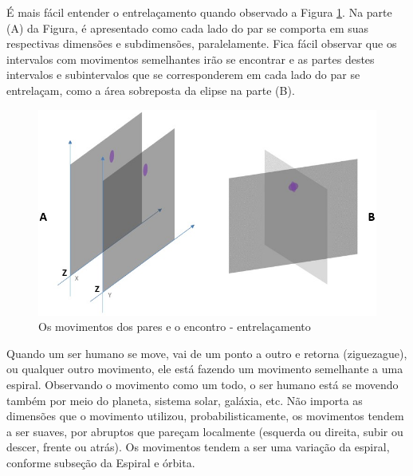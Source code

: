 É mais fácil entender o entrelaçamento quando observado a Figura \ref{fig:consciousness_space_dimensions}. Na parte (A) da Figura, é apresentado como cada lado do par se comporta em suas respectivas dimensões e subdimensões, paralelamente. Fica fácil observar que os intervalos com movimentos semelhantes irão se encontrar e as partes destes intervalos e subintervalos que se corresponderem em cada lado do par se entrelaçam, como a área sobreposta da elipse na parte (B).  
	\begin{figure}[H]
	\caption{Os movimentos dos pares e o encontro - entrelaçamento}
	\label{fig:consciousness_space_dimensions}
	\centering
	\includegraphics[scale=.7]{sections/images/consciousness_space_dimensions.jpg}
	\end{figure}

Quando um ser humano se move, vai de um ponto a outro e retorna (ziguezague), ou qualquer outro movimento, ele está fazendo um movimento semelhante a uma espiral. Observando o movimento como um todo, o ser humano está se movendo também por meio do planeta, sistema solar, galáxia, etc. Não importa as dimensões que o movimento utilizou, probabilisticamente, os movimentos tendem a ser suaves, por abruptos que pareçam localmente (esquerda ou direita, subir ou descer, frente ou atrás). Os movimentos tendem a ser uma variação da espiral, conforme subseção da Espiral e órbita.

